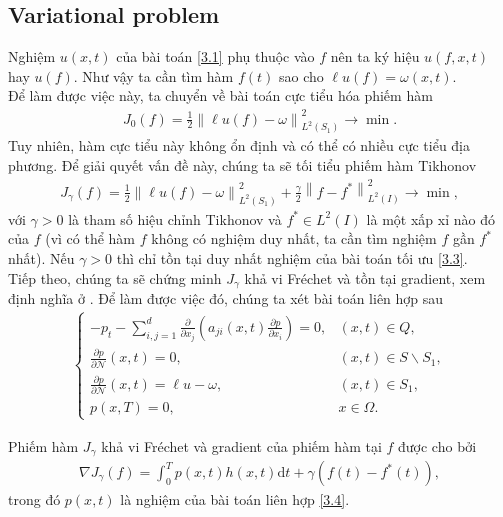 \documentclass[]{article}
\begin{document}
\subsection{Variational problem}
\qquad Nghiệm $u(x, t)$ của bài toán \eqref{3.1} phụ thuộc vào $f$ nên ta ký hiệu $u(f, x, t)$ hay $u(f)$. Như vậy ta cần tìm hàm $f(t)$ sao cho $\ell u(f)=\omega(x, t)$.
\\
Để làm được việc này, ta chuyển về bài toán cực tiểu hóa phiếm hàm
\begin{align}\label{3.2}
	J_0(f)=\frac{1}{2}\left\|\ell u(f)-\omega\right\|_{L^2(S_1)}^2\to \min.
\end{align}
Tuy nhiên, hàm cực tiểu này không ổn định và có thể có nhiều cực tiểu địa phương. Để giải quyết vấn đề này, chúng ta sẽ tối tiểu phiếm hàm Tikhonov
\begin{align}\label{3.3}
	J_{\gamma}(f)=\frac{1}{2}\left\|\ell u(f)-\omega\right\|_{L^2(S_1)}^2+\frac{\gamma}{2}\left\|f-f^*\right\|_{L^2(I)}^2\to \min,
\end{align}
với $\gamma >0$ là tham số hiệu chỉnh Tikhonov và $f^*\in L^2(I)$ là một xấp xỉ nào đó của $f$ (vì có thể hàm $f$ không có nghiệm duy nhất, ta cần tìm nghiệm $f$ gần $f^*$ nhất). Nếu $\gamma>0$ thì chỉ tồn tại duy nhất nghiệm của bài toán tối ưu \eqref{3.3}.\\
Tiếp theo, chúng ta sẽ chứng minh $J_\gamma$ khả vi Fréchet và tồn tại gradient, xem định nghĩa ở \cite[trang 58]{b1}. Để làm được việc đó, chúng ta xét bài toán liên hợp sau
\begin{align}\label{3.4}
	\begin{cases}
		-p_t-\sum_{i, j=1}^{d}\frac{\partial}{\partial x_j}\left(a_{ji}(x, t)\frac{\partial p}{\partial x_i}\right)=0, & (x, t)\in Q,\\
		\frac{\partial p}{\partial \mathcal{N}}(x, t)=0, & (x, t)\in S\backslash S_1,\\[0.2cm]
		\frac{\partial p}{\partial \mathcal{N}}(x, t)=\ell u-\omega, & (x, t)\in S_1,\\
		p(x, T)=0, & x\in \Omega.
	\end{cases}
\end{align}
\begin{dl}\label{dl3.1}
	Phiếm hàm $J_\gamma$ khả vi Fréchet và gradient của phiếm hàm tại $f$ được cho bởi
	\begin{align}\label{3.5}
		\nabla J_\gamma(f)=\int_{0}^{T}p(x, t)h(x, t)\mathrm{d}t+\gamma (f(t)-f^*(t)),
	\end{align}
	trong đó $p(x, t)$ là nghiệm của bài toán liên hợp \eqref{3.4}.
\end{dl}
\end{document}
